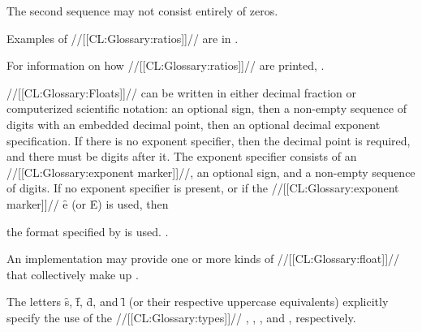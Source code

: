 The second sequence may not consist entirely of zeros.

Examples of //[[CL:Glossary:ratios]]// are in \thenextfigure.



For information on how //[[CL:Glossary:ratios]]// are printed, \seesection\PrintingRatios.

\endsubsubsubsection%

\endsubsubsection%

 

//[[CL:Glossary:Floats]]// can be written in either decimal fraction or computerized scientific notation: an optional sign, then a non-empty sequence of digits with an embedded decimal point, then an optional decimal exponent specification. If there is no exponent specifier, then the decimal point is required, and there must be digits after it. The exponent specifier consists of an //[[CL:Glossary:exponent marker]]//, an optional sign, and a non-empty sequence of digits. If no exponent specifier is present, or if the //[[CL:Glossary:exponent marker]]// \f{e} (or \f{E}) is used, then

the format specified by  is used. \Seefigure\SyntaxForNumericTokens.

An implementation may provide one or more kinds of //[[CL:Glossary:float]]// that collectively make up .

The letters \f{s}, \f{f}, \f{d}, and \f{l} (or their respective uppercase equivalents) explicitly specify the use of the //[[CL:Glossary:types]]// , ,  , and , respectively.
                                                

